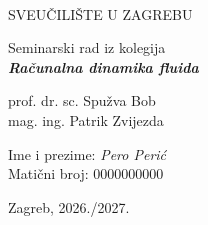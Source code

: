 \documentclass[a4paper,12pt]{article}
\begin{document}

\begin{titlepage}
\begin{center}

{\fontsize{20}{28}\selectfont {}}\\

\vspace*{0.5cm}
{\fontsize{18}{22}\selectfont SVEUČILIŠTE U ZAGREBU}

\vspace*{5cm}

{\fontsize{22}{24}\selectfont Seminarski rad iz kolegija}\\
\vspace*{1cm}
{\fontsize{24}{24}\selectfont \textbf{\textit{Računalna dinamika fluida}}}

\vspace{1cm}

{\fontsize{18}{18}\selectfont prof. dr. sc. Spužva Bob}\\
{\fontsize{18}{18}\selectfont mag. ing. Patrik Zvijezda}

\vfill

\begin{flushleft}
{\fontsize{14}{18}\selectfont Ime i prezime: \textit{Pero Perić}}\\
{\fontsize{12}{18}\selectfont Matični broj: 0000000000}
\end{flushleft}


\vspace{1.5cm}

\begin{flushright}
{\fontsize{14}{18}\selectfont Zagreb, 2026./2027.}
\end{flushright}



\end{center}
\end{titlepage}


\newpage
{}

\tableofcontents

\newpage
\listoffigures
{}
\end{document}
